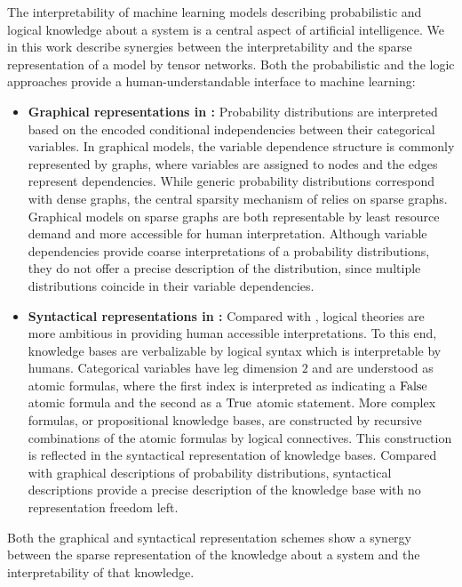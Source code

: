 The interpretability of machine learning models describing probabilistic and logical knowledge about a system is a central aspect of artificial intelligence.
We in this work describe synergies between the interpretability and the sparse representation of a model by tensor networks.
Both the probabilistic and the logic approaches provide a human-understandable interface to machine learning:
\begin{itemize} %
    \item \textbf{Graphical representations in \probabilityTheory{}:} Probability distributions are interpreted based on the encoded conditional independencies between their categorical variables.
    In graphical models, the variable dependence structure is commonly represented by graphs, where variables are assigned to nodes and the edges represent dependencies.
    While generic probability distributions correspond with dense graphs, the central sparsity mechanism of \probabilityTheory{} relies on sparse graphs.
    Graphical models on sparse graphs are both representable by least resource demand and more accessible for human interpretation.
    Although variable dependencies provide coarse interpretations of a probability distributions, they do not offer a precise description of the distribution, since multiple distributions coincide in their variable dependencies.
    \item \textbf{Syntactical representations in \propositionalLogic{}:} Compared with \probabilityTheory{}, logical theories are more ambitious in providing human accessible interpretations.
    To this end, knowledge bases are verbalizable by logical syntax which is interpretable by humans.
    Categorical variables have leg dimension $2$ and are understood as atomic formulas, where the first index is interpreted as indicating a $\mathrm{False}$ atomic formula and the second as a $\mathrm{True}$ atomic statement.
    More complex formulas, or propositional knowledge bases, are constructed by recursive combinations of the atomic formulas by logical connectives.
    This construction is reflected in the syntactical representation of knowledge bases.
    Compared with graphical descriptions of probability distributions, syntactical descriptions provide a precise description of the knowledge base with no representation freedom left.
\end{itemize}
Both the graphical and syntactical representation schemes show a synergy between the sparse representation of the knowledge about a system and the interpretability of that knowledge.

